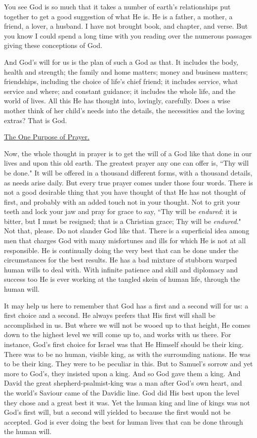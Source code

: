 You see God is so much that it takes a number of earth's relationships put
together to get a good suggestion of what He is. He is a father, a
mother, a friend, a lover, a husband. I have not brought book, and
chapter, and verse. But you know I could spend a long time with you
reading over the numerous passages giving these conceptions of God.

And God's will for us is the plan of such a God as that. It includes the
body, health and strength; the family and home matters; money and business
matters; friendships, including the choice of life's chief friend; it
includes service, what service and where; and constant guidance; it
includes the whole life, and the world of lives. All this He has thought
into, lovingly, carefully. Does a wise mother think of her child's needs
into the details, the necessities and the loving extras? That is God.



\underline{The One Purpose of Prayer.}


Now, the whole thought in prayer is to get the will of a God like that
done in our lives and upon this old earth. The greatest prayer any one can
offer is, ``Thy will be done." It will be offered in a thousand different
forms, with a thousand details, as needs arise daily. But every true
prayer comes under those four words. There is not a good desirable thing
that you have thought of that He has not thought of first, and probably
with an added touch not in your thought. Not to grit your teeth and lock
your jaw and pray for grace to say, ``Thy will be \textit{endured}: it is bitter,
but I must be resigned; that is a Christian grace; Thy will be
\textit{endured}." Not that, please. Do not slander God like that. There is a
superficial idea among men that charges God with many misfortunes and ills
for which He is not at all responsible. He is continually doing the very
best that can be done under the circumstances for the best results. He has
a bad mixture of stubborn warped human wills to deal with. With infinite
patience and skill and diplomacy and success too He is ever working at the
tangled skein of human life, through the human will.

It may help us here to remember that God has a first and a second will for
us: a first choice and a second. He always prefers that His first will
shall be accomplished in us. But where we will not be wooed up to that
height, He comes down to the highest level we will come up to, and works
with us there. For instance, God's first choice for Israel was that He
Himself should be their king. There was to be no human, visible king, as
with the surrounding nations. He was to be their king. They were to be
peculiar in this. But to Samuel's sorrow and yet more to God's, they
insisted upon a king. And so God gave them a king. And David the great
shepherd-psalmist-king was a man after God's own heart, and the world's
Saviour came of the Davidic line. God did His best upon the level they
chose and a great best it was. Yet the human king and line of kings was
not God's first will, but a second will yielded to because the first
would not be accepted. God is ever doing the best for human lives that can
be done through the human will.

